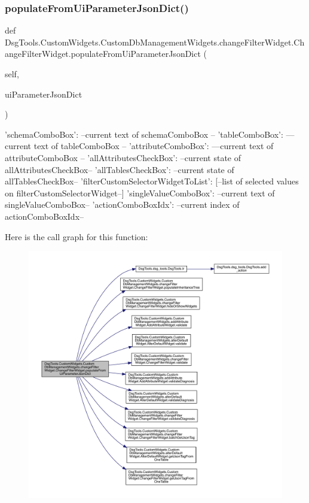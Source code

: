 \subsubsection{\texorpdfstring{populate\+From\+Ui\+Parameter\+Json\+Dict()}{populateFromUiParameterJsonDict()}}
{\footnotesize\ttfamily def Dsg\+Tools.\+Custom\+Widgets.\+Custom\+Db\+Management\+Widgets.\+change\+Filter\+Widget.\+Change\+Filter\+Widget.\+populate\+From\+Ui\+Parameter\+Json\+Dict (\begin{DoxyParamCaption}\item[{}]{self,  }\item[{}]{ui\+Parameter\+Json\+Dict }\end{DoxyParamCaption})}

\begin{DoxyVerb}{
    'schemaComboBox': --current text of schemaComboBox --
    'tableComboBox': ---current text of tableComboBox --
    'attributeComboBox': ---current text of attributeComboBox --
    'allAttributesCheckBox': --current state of allAttributesCheckBox--
    'allTablesCheckBox': --current state of allTablesCheckBox--
    'filterCustomSelectorWidgetToList': [--list of selected values on filterCustomSelectorWidget--]
    'singleValueComboBox': --current text of singleValueComboBox--
    'actionComboBoxIdx': --current index of actionComboBoxIdx--
}
\end{DoxyVerb}
 Here is the call graph for this function\+:
\nopagebreak
\begin{figure}[H]
\begin{center}
\leavevmode
\includegraphics[width=350pt]{class_dsg_tools_1_1_custom_widgets_1_1_custom_db_management_widgets_1_1change_filter_widget_1_1_change_filter_widget_a05e71bee08fa2f3dcc25546f6feaf891_cgraph}
\end{center}
\end{figure}
